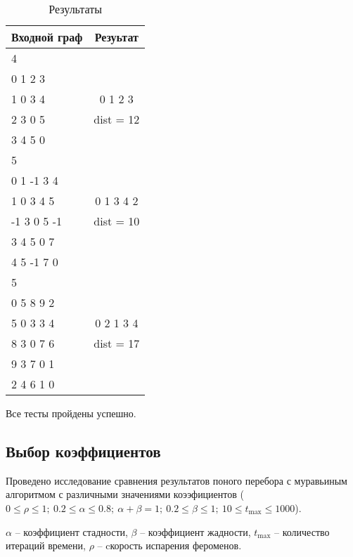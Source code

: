\begin{table}[H]
    \caption{Результаты}
    \label{table:test_result}
    \centering
    \begin{tabular}{|l||c|}
        \hline
        Входной граф & Резуьтат \\
        \hline
        \hline
        \hline
        4 & \\
        0 1 2 3 & \\
        1 0 3 4 & 0 1 2 3 \\
        2 3 0 5 & dist = 12 \\
        3 4 5 0 & \\
        \hline
        5 & \\
        0 1 -1 3 4 & \\
        1 0 3 4 5 & 0 1 3 4 2 \\
        -1 3 0 5 -1 & dist = 10 \\
        3 4 5 0 7 & \\
        4 5 -1 7 0 & \\
        \hline
        5 & \\
        0 5 8 9 2 & \\
        5 0 3 3 4 & 0 2 1 3 4 \\
        8 3 0 7 6 & dist = 17 \\
        9 3 7 0 1 & \\
        2 4 6 1 0 & \\
        \hline
    \end{tabular}
\end{table}

Все тесты пройдены успешно.

\subsection{Выбор коэффициентов}

Проведено исследование сравнения результатов поного перебора с муравьиным алгоритмом с различными
значениями коээфициентов
($0 \le \rho \le 1;\ 0.2 \le \alpha \le 0.8;\ \alpha + \beta = 1;\ 0.2 \le \beta \le 1;\ 10 \le t_{\max} \le 1000$).

$\alpha$ -- коэффициент стадности, $\beta$ -- коэффициент жадности, $t_{\max}$ -- количество итераций времени, $\rho$ -- cкорость
испарения фероменов.

